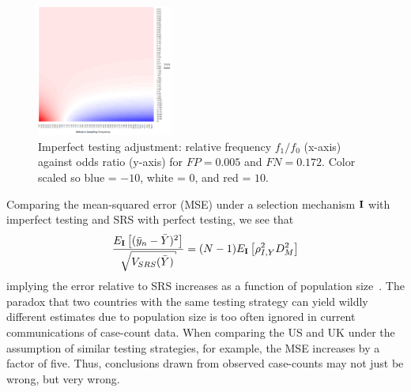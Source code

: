 \documentclass[12pt]{amsart}
\numberwithin{equation}{section}
\theoremstyle{plain}
\def\I{\bf I}
\begin{document}
\begin{figure}[!th]
\centering
\includegraphics[width = 0.4\textwidth]{../methods/figs/mem_heatmap_article.png}
\caption{Imperfect testing adjustment: relative frequency $f_1/f_0$ (x-axis) against odds ratio (y-axis) for $FP=0.005$ and $FN=0.172$. Color scaled so blue = $-10$, white = $0$, and red = $10$.}
\label{fig:heatmap}
\vspace{-0.3cm}
\end{figure}

Comparing the mean-squared error (MSE) under a selection mechanism $\I$ with imperfect testing and SRS with perfect testing, we see that
$$
\frac{E_{\I} \left[ (\bar y_n - \bar Y)^2 \right]}{\sqrt{V_{SRS} (\bar Y)}} = (N-1) E_{\I} \left[ \rho_{I,Y}^2 D_M^2 \right]
$$
implying the error relative to SRS increases as a function of population size~\citep{Meng2018}. The paradox that two countries with the same testing strategy can yield wildly different estimates due to population size is too often ignored in current communications of case-count data.  When comparing the US and UK under the assumption of similar testing strategies, for example, the MSE increases by a factor of five.  Thus, conclusions drawn from observed case-counts may not just be wrong, but very wrong.
\end{document}
